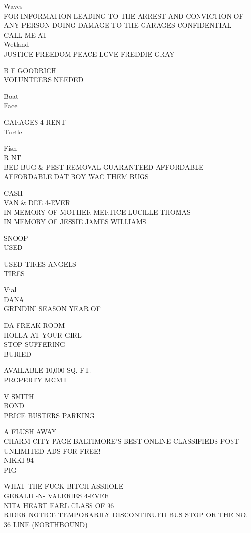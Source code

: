 \documentclass[10pt,letterpaper]{article}
\begin{document}
Waves\\
FOR INFORMATION LEADING TO THE ARREST AND CONVICTION OF ANY PERSON DOING DAMAGE TO THE GARAGES CONFIDENTIAL CALL ME AT\\
Wetland\\
JUSTICE FREEDOM PEACE LOVE FREDDIE GRAY

B F GOODRICH\\
VOLUNTEERS NEEDED

Boat\\
Face

GARAGES 4 RENT\\
Turtle

Fish\\
R NT\\
BED BUG \& PEST REMOVAL GUARANTEED AFFORDABLE AFFORDABLE DAT BOY WAC THEM BUGS

CASH\\
VAN \& DEE 4{-}EVER\\
IN MEMORY OF MOTHER MERTICE LUCILLE THOMAS\\
IN MEMORY OF JESSIE JAMES WILLIAMS

SNOOP\\
USED

USED TIRES ANGELS\\
TIRES

Vial\\
DANA\\
GRINDIN' SEASON YEAR OF

DA FREAK ROOM\\
HOLLA AT YOUR GIRL\\
STOP SUFFERING\\
BURIED

AVAILABLE 10,000 SQ. FT.\\
PROPERTY MGMT

V SMITH\\
BOND\\
PRICE BUSTERS PARKING

A FLUSH AWAY\\
CHARM CITY PAGE BALTIMORE'S BEST ONLINE CLASSIFIEDS POST UNLIMITED ADS FOR FREE!\\
NIKKI 94\\
PIG

WHAT THE FUCK BITCH ASSHOLE\\
GERALD {-}N{-} VALERIES 4{-}EVER\\
NITA HEART EARL CLASS OF 96\\
RIDER NOTICE TEMPORARILY DISCONTINUED BUS STOP OR THE NO. 36 LINE (NORTHBOUND)
\end{document}
